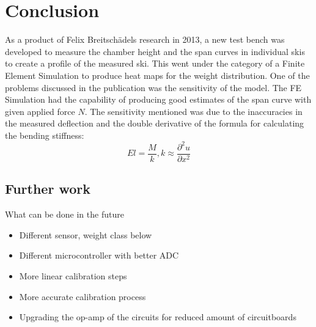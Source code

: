 \chapter{Conclusion}
As a product of Felix Breitschädels research in 2013, a new test bench was developed to measure the chamber height and the span curves in individual skis to create a profile of the measured ski. This went under the category of a Finite Element Simulation to produce heat maps for the weight distribution. One of the problems discussed in the publication was the sensitivity of the model. The FE Simulation had the capability of producing good estimates of the span curve with given applied force $N$. The sensitivity mentioned was due to the inaccuracies in the measured deflection and the double derivative of the formula for calculating the bending stiffness:
\begin{equation}
    El = \frac{M}{k} , k \approx \frac{\partial^2 u}{\partial x^2} 
\end{equation}

\section{Further work}
What can be done in the future
\begin{itemize}
    \item Different sensor, weight class below
    \item Different microcontroller with better ADC
    \item More linear calibration steps
    \item More accurate calibration process
    \item Upgrading the op-amp of the circuits for reduced amount of circuitboards
\end{itemize}